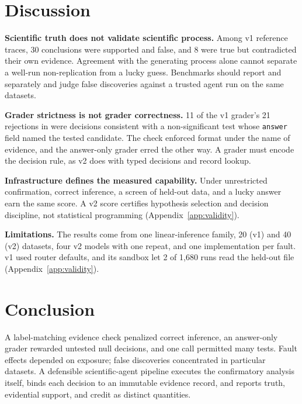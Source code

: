 \section{Discussion}
\label{sec:discussion}
\textbf{Scientific truth does not validate scientific process.} Among v1
reference traces, 30 conclusions were supported and false, and 8 were true
but contradicted their own evidence. Agreement with the generating process
alone cannot separate a well-run non-replication from a lucky guess.
Benchmarks should report  and  separately and judge false
discoveries against a trusted agent run on the same datasets.

\textbf{Grader strictness is not grader correctness.} 11 of the v1 grader's
21 rejections in  were decisions consistent with a non-significant
test whose \texttt{answer} field named the tested candidate. The check
enforced format under the name of evidence, and the answer-only grader erred
the other way. A grader must encode the decision rule, as v2 does with typed
decisions and record lookup.

\textbf{Infrastructure defines the measured capability.} Under unrestricted
confirmation, correct inference, a screen of held-out data, and a lucky answer
earn the same score. A v2 score certifies hypothesis selection and decision
discipline, not statistical programming (Appendix~\ref{app:validity}).

\textbf{Limitations.} The results come from one linear-inference family, 20
(v1) and 40 (v2) datasets, four v2 models with one repeat, and one
implementation per fault. v1 used router defaults, and its sandbox let 2 of
1,680 runs read the held-out file (Appendix~\ref{app:validity}).

\section{Conclusion}
\label{sec:conclusion}
A
label-matching evidence check penalized correct inference, an answer-only
grader rewarded untested null decisions, and one call permitted many
tests. Fault effects depended on exposure; false discoveries concentrated
in particular datasets. A defensible scientific-agent pipeline executes the
confirmatory analysis itself, binds each decision to an immutable evidence
record, and reports truth, evidential support, and credit as distinct
quantities.
